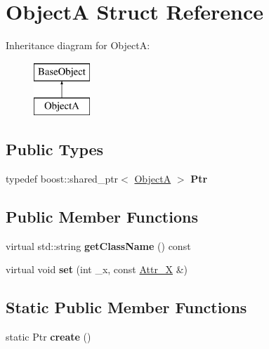 \hypertarget{struct_object_a}{
\section{ObjectA Struct Reference}
\label{struct_object_a}
}
Inheritance diagram for ObjectA:\begin{figure}[H]
\begin{center}
\leavevmode
\includegraphics[height=2.000000cm]{struct_object_a}
\end{center}
\end{figure}
\subsection*{Public Types}
\begin{DoxyCompactItemize}
\item 
\hypertarget{struct_object_a_a615c39b0e253bfcad9919204c748dcd4}{
typedef boost::shared\_\-ptr$<$ \hyperlink{struct_object_a}{ObjectA} $>$ {\bfseries Ptr}}
\label{struct_object_a_a615c39b0e253bfcad9919204c748dcd4}

\end{DoxyCompactItemize}
\subsection*{Public Member Functions}
\begin{DoxyCompactItemize}
\item 
\hypertarget{struct_object_a_a533e7af50df4a23f599338ea12bf673e}{
virtual std::string {\bfseries getClassName} () const }
\label{struct_object_a_a533e7af50df4a23f599338ea12bf673e}

\item 
\hypertarget{struct_object_a_af52944a1a131b25cc1c4f28c4e7385ed}{
virtual void {\bfseries set} (int \_\-x, const \hyperlink{struct_attr___x}{Attr\_\-X} \&)}
\label{struct_object_a_af52944a1a131b25cc1c4f28c4e7385ed}

\end{DoxyCompactItemize}
\subsection*{Static Public Member Functions}
\begin{DoxyCompactItemize}
\item 
\hypertarget{struct_object_a_aac647760fb1d795cbd4cdc2d229d5509}{
static Ptr {\bfseries create} ()}
\label{struct_object_a_aac647760fb1d795cbd4cdc2d229d5509}

\end{DoxyCompactItemize}
